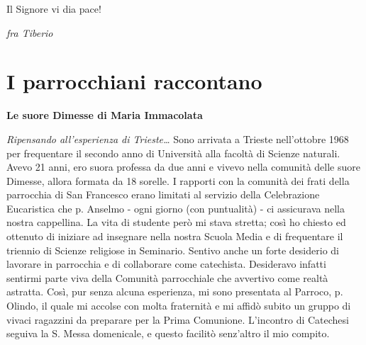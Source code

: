\noindent Il Signore vi dia pace!
\begin{flushright}
\textit{fra Tiberio}
\end{flushright}
\endgroup
\chapter{I parrocchiani raccontano}
{}
\begin{center}
\textbf{\Large Le suore Dimesse di Maria Immacolata}
\end{center}
\bigbreak
\noindent \textit{Ripensando all’esperienza di Trieste…}
\medbreak
\noindent Sono arrivata a Trieste nell’ottobre 1968 per frequentare il secondo anno di Università alla
facoltà di Scienze naturali. Avevo 21 anni, ero suora professa da due anni e vivevo nella comunità 
delle suore Dimesse, allora formata da 18 sorelle. I rapporti con la comunità dei frati della 
parrocchia di San Francesco erano limitati al servizio della Celebrazione Eucaristica che p. 
Anselmo - ogni giorno (con puntualità) - ci assicurava nella nostra cappellina. La vita di studente 
però mi stava stretta; così ho chiesto ed ottenuto di iniziare ad insegnare nella nostra Scuola Media 
e di frequentare il triennio di Scienze religiose in Seminario. Sentivo anche un forte desiderio di 
lavorare in parrocchia e di collaborare come catechista. Desideravo infatti sentirmi parte viva della 
Comunità parrocchiale che avvertivo come realtà astratta. Così, pur senza alcuna esperienza, mi 
sono presentata al Parroco, p. Olindo, il quale mi accolse con molta fraternità e mi affidò subito un 
gruppo di vivaci ragazzini da preparare per la Prima Comunione. L’incontro di Catechesi seguiva la 
S. Messa domenicale, e questo facilitò senz’altro il mio compito. 

